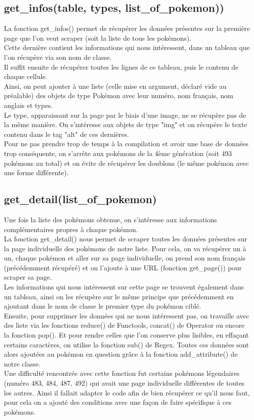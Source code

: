 \documentclass[a4paper, titlepage]{report}
\begin{document}
\subsection*{get\_infos(table, types, list\_of\_pokemon))}
\textnormal{La fonction get\_infos() permet de récupérer les données présentes sur la première page que l'on veut scraper (soit la liste de tous les pokémons).\\
Cette dernière contient les informations qui nous intéressent, dans un tableau que l'on récupère via son nom de classe.\\
Il suffit ensuite de récupérer toutes les lignes de ce tableau, puis le contenu de chaque cellule.\\
Ainsi, on peut ajouter à une liste (celle mise en argument, déclaré vide au préalable) des objets de type Pokémon avec leur numéro, nom français, nom anglais et types.\\
Le type, apparaissant sur la page par le biais d'une image, ne se récupère pas de la même manière. On s'intéresse aux objets de type "img" et on récupère le texte contenu dans le tag "alt" de ces dernières.\\
Pour ne pas prendre trop de temps à la compilation et avoir une base de données trop conséquente, on s'arrête aux pokémons de la 4ème génération (soit 493 pokémons au total) et on évite de récupérer les doublons (le même pokémon avec une forme différente).}

\newpage
\subsection*{get\_detail(list\_of\_pokemon)}
\textnormal{Une fois la liste des pokémons obtenue, on s'intéresse aux informations complémentaires propres à chaque pokémon.\\
La fonction get\_detail() nous permet de scraper toutes les données présentes sur la page individuelle des pokémons de notre liste. Pour cela, on va récupérer un à un, chaque pokémon et aller sur sa page individuelle, on prend son nom français (précédemment récupéré) et on l'ajoute à une URL (fonction get\_page()) pour scraper sa page.\\
Les informations qui nous intéressent sur cette page se trouvent également dans un tableau, ainsi on les récupère sur le même principe que précédemment en ajoutant dans le nom de classe le premier type du pokémon ciblé.\\ 
Ensuite, pour supprimer les données qui ne nous intéressent pas, on travaille avec des liste via les fonctions reduce() de Functools, concat() de Operator ou encore la fonction pop(). Et pour rendre celles que l'on conserve plus lisibles, en effaçant certains caractères, on utilise la fonction sub() de Regex.
Toutes ces données sont alors ajoutées au pokémon en question grâce à la fonction add\_attribute() de notre classe.\\
Une difficulté rencontrée avec cette fonction fut certains pokémons légendaires (numéro 483, 484, 487, 492) qui avait une page individuelle différentes de toutes les autres. Ainsi il fallait adapter le code afin de bien récupérer ce qu'il nous faut, pour cela on a ajouté des conditions avec une façon de faire spécifique à ces pokémons.}
\end{document}
